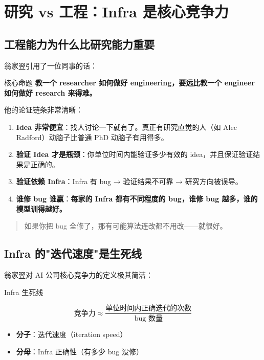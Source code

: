 \documentclass[a4paper]{article}
\begin{document}
\section{研究 vs 工程：Infra 是核心竞争力}

\subsection{工程能力为什么比研究能力重要}

翁家翌引用了一位同事的话：

\begin{importantbox}{核心命题}{
\textbf{教一个 researcher 如何做好 engineering，要远比教一个 engineer 如何做好 research 来得难。}
}
\end{importantbox}

他的论证链条非常清晰：

\begin{enumerate}
\item \textbf{Idea 非常便宜}：找人讨论一下就有了。真正有研究直觉的人（如 Alec Radford）动脑子比普通 PhD 动脑子有用得多。
\item \textbf{验证 Idea 才是瓶颈}：你单位时间内能验证多少有效的 idea，并且保证验证结果是正确的。
\item \textbf{验证依赖 Infra}：Infra 有 bug → 验证结果不可靠 → 研究方向被误导。
\item \textbf{谁修 bug 谁赢}：\textbf{每家的 Infra 都有不同程度的 bug，谁修 bug 越多，谁的模型训得越好。}
\end{enumerate}

\begin{quote}
如果你把 bug 全修了，那有可能算法连改都不用改——就很好。
\end{quote}

\subsection{Infra 的"迭代速度"是生死线}

翁家翌对 AI 公司核心竞争力的定义极其简洁：

\begin{importantbox}{Infra 生死线}

$$ \text{竞争力} \approx \frac{\text{单位时间内正确迭代的次数}}{\text{bug 数量}} $$
\begin{itemize}
\item \textbf{分子}：迭代速度（iteration speed）
\item \textbf{分母}：Infra 正确性（有多少 bug 没修）
\end{itemize}
\end{importantbox}
\end{document}
